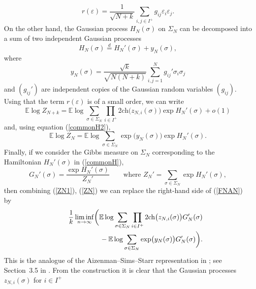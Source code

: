 \documentclass[aop,MSNbibl,dvips]{arximspdf}
\newcommand{\eps}{{\varepsilon}}
\newcommand{\ch}{\mathrm{ch}}
\newcommand{\smsp}{}
\newcommand{\e}{\mathbb{E}}
\begin{document}
\begin{equation}
r(\eps)= \frac{1}{\sqrt{N+k}} \sum_{i,j\in I^+}
g_{ij}\eps_i \eps_j.
\end{equation}
%
On the other hand, the Gaussian process $H_N(\sigma)$ on $\Sigma_N$ can
be decomposed into a sum of two independent Gaussian processes
%
\begin{equation}
H_N(\sigma) \stackrel{d} {=} H_N'(\sigma)
+ y_N(\sigma), \label{commonH2}
\end{equation}
%
where
%
\begin{equation}
y_N(\sigma) = \frac{\sqrt{k}}{\sqrt{N(N+k)}} \sum_{i,j =1}^N
g_{ij}'\sigma_i \sigma_j
\end{equation}
%
and $(g_{ij}')$ are independent copies of the Gaussian random variables
$(g_{ij})$. Using that the term $r(\eps)$ is of a small order, we can write
%
\begin{equation}
\e\log Z_{N+k} = \e\log\sum_{\sigma\in\Sigma_N} \prod
_{i\in I^+} 2\smsp\ch \bigl(z_{N,i}(\sigma)
\bigr) \exp H_{N}'(\sigma) + o(1) \label{ZN1}
\end{equation}
%
and, using equation (\ref{commonH2}),
%
\begin{equation}
\e\log Z_{N} = \e\log\sum_{\sigma\in\Sigma_N} \exp
\bigl(y_N(\sigma) \bigr) \exp H_{N}'(\sigma).
\label{ZN}
\end{equation}
%
Finally, if we consider the Gibbs measure on $\Sigma_N$
corresponding to the Hamiltonian $H_N'(\sigma)$ in (\ref{commonH}),
%
\begin{equation}
G_N'(\sigma) = \frac{\exp H_N'(\sigma)}{Z_N'}\qquad \mbox{where }
Z_N' = \sum_{\sigma\in\Sigma_{N}} \exp
H_N'(\sigma), \label{MeasureGNprime}
\end{equation}
%
then combining (\ref{ZN1}), (\ref{ZN}) we can replace the right-hand
side of (\ref{FNAN}) by
%
\begin{eqnarray}\label{AS2repr}
&&\frac{1}{k}\liminf_{n\to\infty} \biggl(  \e\log\sum
_{\sigma\in\Sigma_{N}} \prod_{i\in I^+} 2\smsp\ch
\bigl(z_{N,i}(\sigma) \bigr) G_N'(\sigma)
\nonumber
\\[-8pt]
\\[-8pt]
\nonumber
&&\hspace*{58pt}{}- \e\log\sum_{\sigma\in\Sigma_{N}} \exp \bigl(y_N(
\sigma) \bigr) G_N'(\sigma) \biggr).
\end{eqnarray}
%
This is the analogue of the Aizenman--Sims--Starr representation in
\cite{AS2}; see Section~3.5 in \cite{SKmodel}. From the construction it
is clear that the Gaussian processes $z_{N,i}(\sigma)$ for $i\in I^+$
\end{document}
